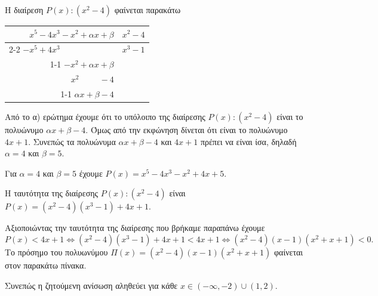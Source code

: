\begin{alist}
\item Η διαίρεση $P(x) : (x^2 - 4)$ φαίνεται παρακάτω
\begin{center}
\begin{tabular}{r|l}
$x^5 - 4x^3 - x^2 + \alpha x + \beta$ & $x^2 - 4$ \\ \cline{2-2}
$-x^5 + 4x^3 \phantom{{} - x^2 + \alpha x + \beta}$ & $x^3 - 1$ \\ \cline{1-1}
$-x^2 + \alpha x + \beta$ & \\
$x^2 \phantom{{} + \alpha x} - 4$ & \\ \cline{1-1}
$\alpha x + \beta - 4$ &
\end{tabular}
\end{center}
\item Από το α) ερώτημα έχουμε ότι το υπόλοιπο της διαίρεσης $P(x) : (x^2 - 4)$ είναι το πολυώνυμο $\alpha x + \beta - 4$. Όμως από την εκφώνηση δίνεται ότι είναι το πολυώνυμο $4x + 1$. Συνεπώς τα πολυώνυμα $\alpha x + \beta - 4$ και $4x + 1$ πρέπει να είναι ίσα, δηλαδή $\alpha = 4$ και $\beta = 5$.
\item Για $\alpha = 4$ και $\beta = 5$ έχουμε $P(x) = x^5 - 4x^3 - x^2 + 4x + 5$.
\begin{rlist}
\item Η ταυτότητα της διαίρεσης $P(x) : (x^2 - 4)$ είναι $P(x) = (x^2 - 4)(x^3 - 1) + 4x + 1$.
\item Αξιοποιώντας την ταυτότητα της διαίρεσης που βρήκαμε παραπάνω έχουμε
\[P(x) < 4x + 1 \Leftrightarrow (x^2 - 4)(x^3 - 1) + 4x + 1 < 4x + 1 \Leftrightarrow (x^2 - 4)(x - 1)(x^2 + x + 1) < 0.\]
Το πρόσημο του πολυωνύμου $\Pi(x) = (x^2 - 4)(x - 1)(x^2 + x + 1)$ φαίνεται στον παρακάτω πίνακα.
\begin{center}
\end{center}
Συνεπώς η ζητούμενη ανίσωση αληθεύει για κάθε $x \in (-\infty, -2) \cup (1, 2)$.
\end{rlist}
\end{alist}

